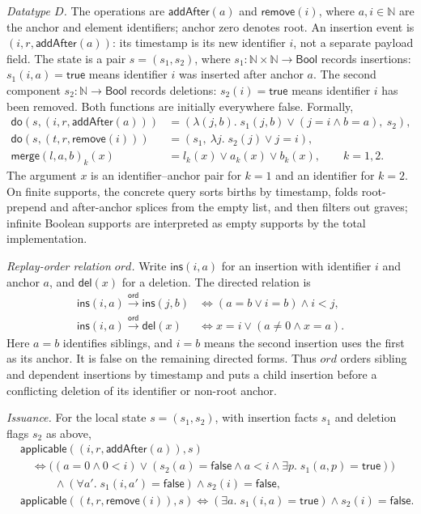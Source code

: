 \documentclass[11pt]{article}
\theoremstyle{definition}
\newcommand{\N}{\mathbb N}
\newcommand{\doop}{\mathsf{do}}
\newcommand{\merge}{\mathsf{merge}}
\newcommand{\ord}{\mathrel{\xrightarrow{\mathsf{ord}}}}
\begin{document}
\emph{Datatype $D$.} The operations are $\mathsf{addAfter}(a)$ and $\mathsf{remove}(i)$, where
$a,i\in\N$ are the anchor and element identifiers; anchor zero denotes root.
An insertion event is $(i,r,\mathsf{addAfter}(a))$: its timestamp is its new
identifier $i$, not a separate payload field.
The state is a pair $s=(s_1,s_2)$, where
$s_1:\N\times\N\to\mathsf{Bool}$ records insertions:
$s_1(i,a)=\mathsf{true}$ means identifier $i$ was inserted after anchor $a$.
The second component $s_2:\N\to\mathsf{Bool}$ records deletions:
$s_2(i)=\mathsf{true}$ means identifier $i$ has been removed.
Both functions are initially everywhere false. Formally,
\[
\begin{aligned}
 \doop(s,(i,r,\mathsf{addAfter}(a)))
   &=(\lambda(j,b).\;s_1(j,b)\lor(j=i\land b=a),\ s_2),\\
 \doop(s,(t,r,\mathsf{remove}(i)))
   &=(s_1,\ \lambda j.\;s_2(j)\lor j=i),\\
 \merge(l,a,b)_k(x)&=l_k(x)\lor a_k(x)\lor b_k(x),\qquad k=1,2.
\end{aligned}
\]
The argument $x$ is an identifier--anchor pair for $k=1$ and an identifier
for $k=2$. On finite supports, the concrete query sorts births by
timestamp, folds root-prepend and after-anchor splices from the empty list, and then filters out
graves; infinite Boolean supports are interpreted as empty supports by the
total implementation.

\emph{Replay-order relation $ord$.} Write $\mathsf{ins}(i,a)$ for an insertion with
identifier $i$ and anchor $a$, and $\mathsf{del}(x)$ for a
deletion. The directed relation is
\[
\begin{aligned}
 \mathsf{ins}(i,a)\ord\mathsf{ins}(j,b)
 &\Longleftrightarrow
   (a=b\lor i=b)\land i<j,\\
 \mathsf{ins}(i,a)\ord\mathsf{del}(x)
 &\Longleftrightarrow x=i\lor(a\ne0\land x=a).
\end{aligned}
\]
Here $a=b$ identifies siblings, and $i=b$ means the second insertion uses the
first as its anchor. It is false on the remaining directed forms. Thus $ord$ orders sibling and
dependent insertions by timestamp and puts a child insertion before a
conflicting deletion of its identifier or non-root anchor.

\emph{Issuance.} For the local state $s=(s_1,s_2)$, with insertion facts
$s_1$ and deletion flags $s_2$ as above,
\[
\begin{aligned}
 &\mathsf{applicable}((i,r,\mathsf{addAfter}(a)),s)\\
 &\quad\Longleftrightarrow
 \bigl((a=0\land 0<i)\lor(s_2(a)=\mathsf{false}\land a<i\land
   \exists p.\;s_1(a,p)=\mathsf{true})\bigr)\\
 &\hspace{3em}\land(\forall a'.\;s_1(i,a')=\mathsf{false})
 \land s_2(i)=\mathsf{false},\\
 &\mathsf{applicable}((t,r,\mathsf{remove}(i)),s)
 \Longleftrightarrow
 (\exists a.\;s_1(i,a)=\mathsf{true})
 \land s_2(i)=\mathsf{false}.
\end{aligned}
\]
\end{document}
